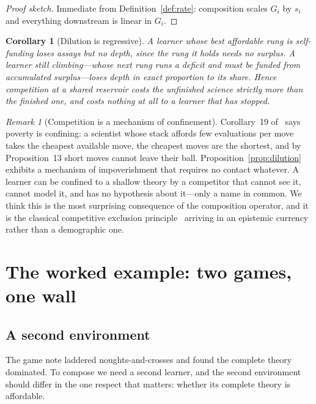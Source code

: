 \documentclass[11pt,a4paper]{article}
\theoremstyle{plain}
\newtheorem{corollary}[theorem]{Corollary}
\theoremstyle{definition}
\theoremstyle{remark}
\newtheorem{remark}[theorem]{Remark}
\begin{document}
\begin{proof}[Proof sketch]
Immediate from Definition~\ref{def:rate}: composition scales $G_i$ by $s_i$ and everything
downstream is linear in $G_i$.
\end{proof}

\begin{corollary}[Dilution is regressive]\label{cor:regressive}
A learner whose best affordable rung is self-funding loses assays but no \emph{depth}, since the
rung it holds needs no surplus. A learner still climbing---whose next rung runs a deficit and must
be funded from accumulated surplus---loses depth in exact proportion to its share. Hence
competition at a shared reservoir costs the unfinished science strictly more than the finished
one, and costs nothing at all to a learner that has stopped.
\end{corollary}

\begin{remark}[Competition is a mechanism of confinement]
Corollary~19 of~\cite{scientist} says poverty is confining: a scientist whose stack affords few
evaluations per move takes the cheapest available move, the cheapest moves are the shortest, and
by Proposition~13 short moves cannot leave their ball. Proposition~\ref{prop:dilution} exhibits
a mechanism of impoverishment that requires no contact whatever. A learner can be confined to a
shallow theory by a competitor that cannot see it, cannot model it, and has no hypothesis about
it---only a name in common. We think this is the most surprising consequence of the composition
operator, and it is the classical competitive exclusion principle~\cite{hardin,tilman} arriving
in an epistemic currency rather than a demographic one.
\end{remark}

\section{The worked example: two games, one wall}\label{sec:worked}

\subsection{A second environment}

The game note laddered noughts-and-crosses and found the complete theory dominated. To compose we
need a second learner, and the second environment should differ in the one respect that matters:
whether its complete theory is affordable.
\end{document}

